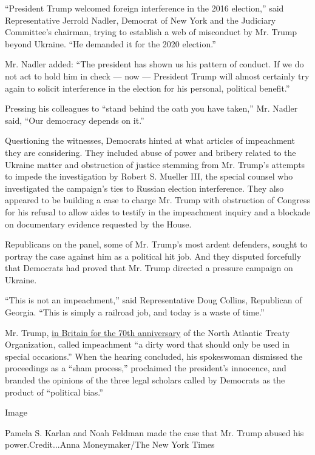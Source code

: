 ``President Trump welcomed foreign interference in the 2016 election,''
said Representative Jerrold Nadler, Democrat of New York and the
Judiciary Committee's chairman, trying to establish a web of misconduct
by Mr. Trump beyond Ukraine. ``He demanded it for the 2020 election.''

Mr. Nadler added: ``The president has shown us his pattern of conduct.
If we do not act to hold him in check --- now --- President Trump will
almost certainly try again to solicit interference in the election for
his personal, political benefit.''

Pressing his colleagues to ``stand behind the oath you have taken,'' Mr.
Nadler said, ``Our democracy depends on it.''

Questioning the witnesses, Democrats hinted at what articles of
impeachment they are considering. They included abuse of power and
bribery related to the Ukraine matter and obstruction of justice
stemming from Mr. Trump's attempts to impede the investigation by Robert
S. Mueller III, the special counsel who investigated the campaign's ties
to Russian election interference. They also appeared to be building a
case to charge Mr. Trump with obstruction of Congress for his refusal to
allow aides to testify in the impeachment inquiry and a blockade on
documentary evidence requested by the House.

Republicans on the panel, some of Mr. Trump's most ardent defenders,
sought to portray the case against him as a political hit job. And they
disputed forcefully that Democrats had proved that Mr. Trump directed a
pressure campaign on Ukraine.

``This is not an impeachment,'' said Representative Doug Collins,
Republican of Georgia. ``This is simply a railroad job, and today is a
waste of time.''

Mr. Trump,
\href{https://www.nytimes3xbfgragh.onion/2019/12/04/world/europe/nato-live-updates-trump-macron.html}{in
Britain for the 70th anniversary} of the North Atlantic Treaty
Organization, called impeachment ``a dirty word that should only be used
in special occasions.'' When the hearing concluded, his spokeswoman
dismissed the proceedings as a ``sham process,'' proclaimed the
president's innocence, and branded the opinions of the three legal
scholars called by Democrats as the product of ``political bias.''

Image

Pamela S. Karlan and Noah Feldman made the case that Mr. Trump abused
his power.Credit...Anna Moneymaker/The New York Times

